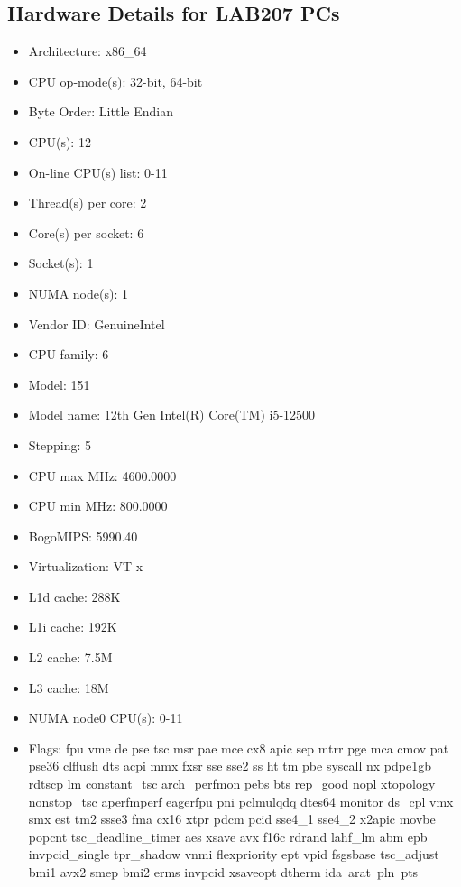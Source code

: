 \documentclass[article, 11pt]{article}
\begin{document}
\subsection{Hardware Details for LAB207 PCs}
\begin{itemize}
    \item Architecture:          x86\_64
\item CPU op-mode(s):        32-bit, 64-bit
\item Byte Order:            Little Endian
\item CPU(s):                12
\item On-line CPU(s) list:   0-11
\item Thread(s) per core:    2
\item Core(s) per socket:    6
\item Socket(s):             1
\item NUMA node(s):          1
\item Vendor ID:             GenuineIntel
\item CPU family:            6
\item Model:                 151
\item Model name:            12th Gen Intel(R) Core(TM) i5-12500
\item Stepping:              5
\item CPU max MHz:           4600.0000
\item CPU min MHz:           800.0000
\item BogoMIPS:              5990.40
\item Virtualization:        VT-x
\item L1d cache:             288K
\item L1i cache:             192K
\item L2 cache:              7.5M
\item L3 cache:              18M
\item NUMA node0 CPU(s):     0-11
\item Flags: fpu vme de pse tsc msr pae mce cx8 apic sep mtrr pge mca cmov pat pse36 clflush dts acpi mmx fxsr sse sse2 ss ht tm pbe syscall nx pdpe1gb rdtscp lm constant\_tsc arch\_perfmon pebs bts rep\_good nopl xtopology nonstop\_tsc aperfmperf eagerfpu pni pclmulqdq dtes64 monitor ds\_cpl vmx smx est tm2 ssse3 fma cx16 xtpr pdcm pcid sse4\_1 sse4\_2 x2apic movbe popcnt tsc\_deadline\_timer aes xsave avx f16c rdrand lahf\_lm abm epb invpcid\_single tpr\_shadow vnmi flexpriority ept vpid fsgsbase tsc\_adjust bmi1 avx2 smep bmi2 erms invpcid xsaveopt dtherm ida arat pln pts
\end{itemize}
\end{document}
